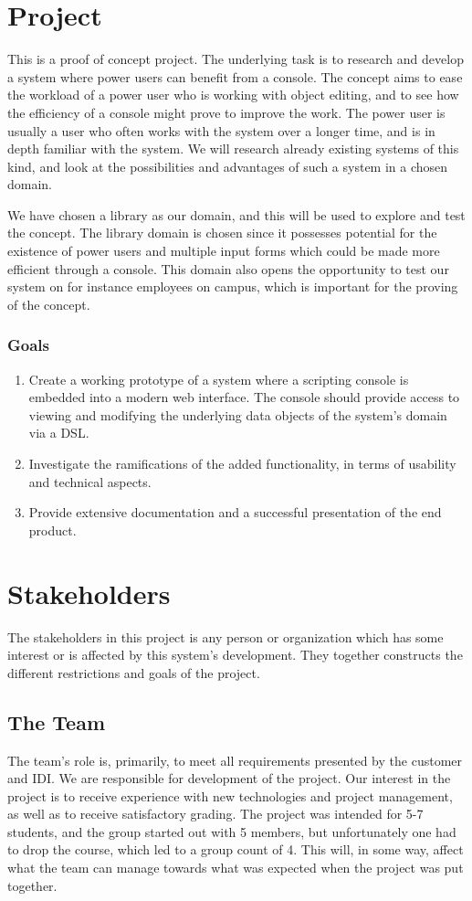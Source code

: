\section{Project}
This is a proof of concept project. The underlying task is to research and develop a system where power users can benefit from a console.  The concept aims to ease the workload of a power user who is working with object editing, and to see how the efficiency of a console might prove to improve the work. The power user is usually a user who often works with the system over a longer time, and is in depth familiar with the system. We will research already existing systems of this kind, and look at the possibilities and advantages of such a system in a chosen domain.

We have chosen a library as our domain, and this will be used to explore and test the concept. The library domain is chosen since it possesses potential for the existence of power users and multiple input forms which could be made more efficient through a console. This domain also opens the opportunity to test our system on for instance employees on campus, which is important for the proving of the concept.
\subsubsection{Goals}
\begin{enumerate}
  \item Create a working prototype of a system where a scripting console is embedded into a modern web interface. The console should provide access to viewing and modifying the underlying data objects of the system's domain via a DSL.
  \item Investigate the ramifications of the added functionality, in terms of usability and technical aspects.
  \item Provide extensive documentation and a successful presentation of the end product.
\end{enumerate}

\section{Stakeholders}
The stakeholders in this project is any person or organization which has some interest or is affected by this system's development. They together constructs the different restrictions and goals of the project.

\subsection{The Team}
The team's role is, primarily, to meet all requirements presented by the customer and IDI. We are responsible for development of the project. Our interest in the project is to receive experience with new technologies and project management, as well as to receive satisfactory grading.
The project was intended for 5-7 students, and the group started out with 5 members, but unfortunately one had to drop the course, which led to a group count of 4. This will, in some way, affect what the team can manage towards what was expected when the project was put together.

